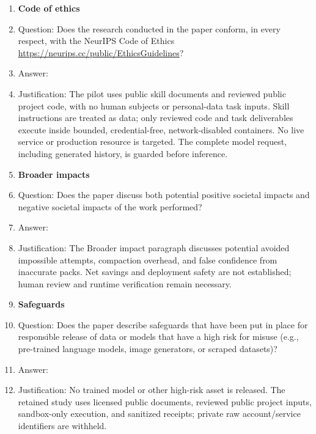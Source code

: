 \begin{enumerate}
\item {\bf Code of ethics}
    \item[] Question: Does the research conducted in the paper conform, in every respect, with the NeurIPS Code of Ethics \url{https://neurips.cc/public/EthicsGuidelines}?
    \item[] Answer: \answerYes{}
    \item[] Justification: The pilot uses public skill documents and reviewed public project code, with no human subjects or personal-data task inputs. Skill instructions are treated as data; only reviewed code and task deliverables execute inside bounded, credential-free, network-disabled containers. No live service or production resource is targeted. The complete model request, including generated history, is guarded before inference.

\item {\bf Broader impacts}
    \item[] Question: Does the paper discuss both potential positive societal impacts and negative societal impacts of the work performed?
    \item[] Answer: \answerYes{}
    \item[] Justification: The Broader impact paragraph discusses potential avoided impossible attempts, compaction overhead, and false confidence from inaccurate packs. Net savings and deployment safety are not established; human review and runtime verification remain necessary.

\item {\bf Safeguards}
    \item[] Question: Does the paper describe safeguards that have been put in place for responsible release of data or models that have a high risk for misuse (e.g., pre-trained language models, image generators, or scraped datasets)?
    \item[] Answer: \answerNA{}
    \item[] Justification: No trained model or other high-risk asset is released. The retained study uses licensed public documents, reviewed public project inputs, sandbox-only execution, and sanitized receipts; private raw account/service identifiers are withheld.


\end{enumerate}
